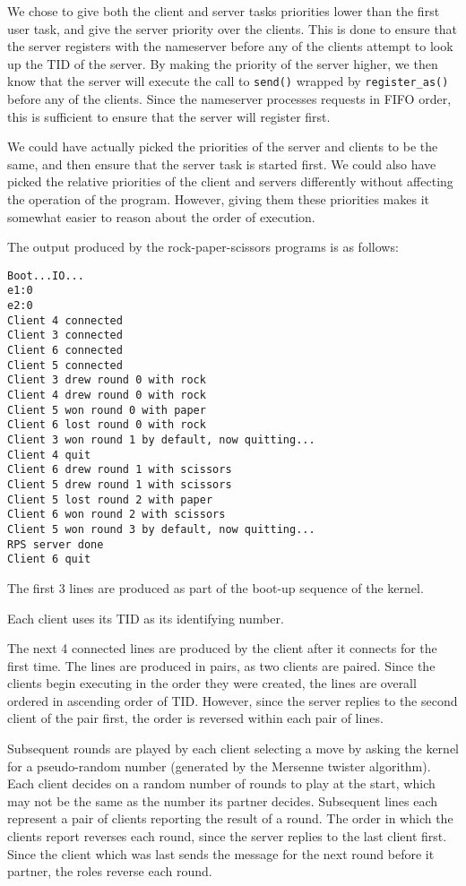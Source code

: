 \documentclass[titlepage]{article}
\begin{document}
We chose to give both the client and server tasks priorities lower than
the first user task, and give the server priority over the clients.
This is done to ensure that the server registers with the nameserver before
any of the clients attempt to look up the TID of the server.
By making the priority of the server higher, we then know that the server will
execute the call to \texttt{send()} wrapped by \texttt{register\_as()} before
any of the clients.
Since the nameserver processes requests in FIFO order, this is sufficient to
ensure that the server will register first.

We could have actually picked the priorities of the server and clients to be the
same, and then ensure that the server task is started first.
We could also have picked the relative priorities of the client and servers differently
without affecting the operation of the program.
However, giving them these priorities makes it somewhat easier to reason about
the order of execution.

The output produced by the rock-paper-scissors programs is as follows:

\begin{verbatim}
Boot...IO...
e1:0
e2:0
Client 4 connected
Client 3 connected
Client 6 connected
Client 5 connected
Client 3 drew round 0 with rock
Client 4 drew round 0 with rock
Client 5 won round 0 with paper
Client 6 lost round 0 with rock
Client 3 won round 1 by default, now quitting...
Client 4 quit
Client 6 drew round 1 with scissors
Client 5 drew round 1 with scissors
Client 5 lost round 2 with paper
Client 6 won round 2 with scissors
Client 5 won round 3 by default, now quitting...
RPS server done
Client 6 quit
\end{verbatim}

The first 3 lines are produced as part of the boot-up sequence of the kernel.

Each client uses its TID as its identifying number.

The next 4 connected lines are produced by the client after it connects for
the first time.
The lines are produced in pairs, as two clients are paired.
Since the clients begin executing in the order they were created, the lines are
overall ordered in ascending order of TID\@.
However, since the server replies to the second client of the pair first,
the order is reversed within each pair of lines.

Subsequent rounds are played by each client selecting a move by asking the kernel
for a pseudo-random number (generated by the Mersenne twister algorithm).
Each client decides on a random number of rounds to play at the start, which may not
be the same as the number its partner decides.
Subsequent lines each represent a pair of clients reporting the result of a round.
The order in which the clients report reverses each round, since the server replies to
the last client first.
Since the client which was last sends the message for the next round before it partner,
the roles reverse each round.
\end{document}
